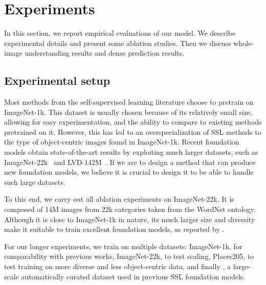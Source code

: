 

\section{Experiments}
\label{sec:experiments}

In this section, we report empirical evaluations of our model.
We describe experimental details and present some ablation studies.
Then we discuss whole-image understanding results and dense prediction results.

\subsection{Experimental setup}

Most methods from the self-supervised learning literature choose to pretrain on ImageNet-1k.
This dataset is usually chosen because of its relatively small size, allowing for easy experimentation, and the ability to compare to existing methods pretrained on it.
However, this has led to an overspecialization of SSL methods to the type of object-centric images found in ImageNet-1k.
Recent foundation models obtain state-of-the-art results by exploiting much larger datasets, such as ImageNet-22k~\citep{ibot} and LVD-142M~\citep{dinov2}.
If we are to design a method that can produce new foundation models, we believe it is crucial to design it to be able to handle such large datasets.

To this end, we carry out all ablation experiments on ImageNet-22k.
It is composed of 14M images from 22k categories taken from the WordNet ontology.
Although it is close to ImageNet-1k in nature, its much larger size and diversity make it suitable to train excellent foundation models, as reported by \citet{dinov2}.

For our longer experiments, we train on multiple datasets: ImageNet-1k, for comparability with previous works, ImageNet-22k, to test scaling, Places205, to test training on more diverse and less object-centric data,
and finally \ourdataset, a large-scale automatically curated dataset used in previous SSL foundation models.  %

